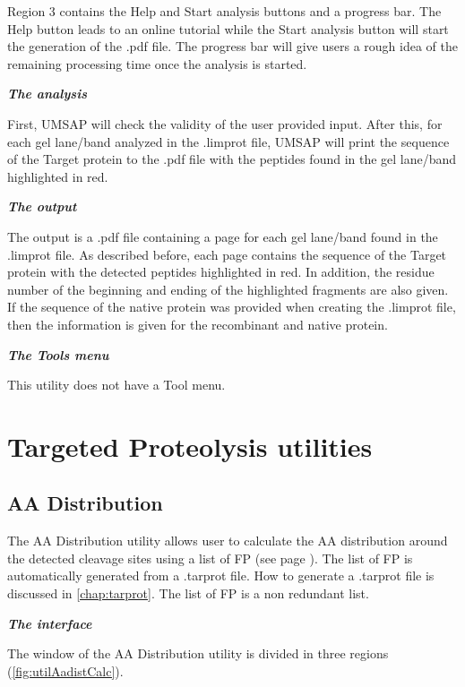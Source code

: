 Region \num{3} contains the Help and Start analysis buttons and a progress bar. The Help button leads to an online tutorial while the Start analysis button will start the generation of the .pdf file. The progress bar will give users a rough idea of the remaining processing time once the analysis is started.

\textit{\textbf{The analysis}}

First, UMSAP will check the validity of the user provided input. After this, for each gel lane/band analyzed in the .limprot file, UMSAP will print the sequence of the Target protein to the .pdf file with the peptides found in the gel lane/band highlighted in red.

\textit{\textbf{The output}} 

The output is a .pdf file containing a page for each gel lane/band found in the .limprot file. As described before, each page contains the sequence of the Target protein with the detected peptides highlighted in red. In addition, the residue number of the beginning and ending of the highlighted fragments are also given. If the sequence of the native protein was provided when creating the .limprot file, then the information is given for the recombinant and native protein. 

\textit{\textbf{The Tools menu}}

This utility does not have a Tool menu.

\section{Targeted Proteolysis utilities }  

\subsection{AA Distribution}
\label{subsec:utilAadistCalc}
The AA Distribution utility allows user to calculate the AA distribution around the detected cleavage sites using a list of FP (see page \pageref{par:tarprotPIP}). The list of FP is automatically generated from a .tarprot file. How to generate a .tarprot file is discussed in \autoref{chap:tarprot}. The list of FP is a non redundant list. 

\textit{\textbf{The interface}}

The window of the AA Distribution utility is divided in three regions (\autoref{fig:utilAadistCalc}).

